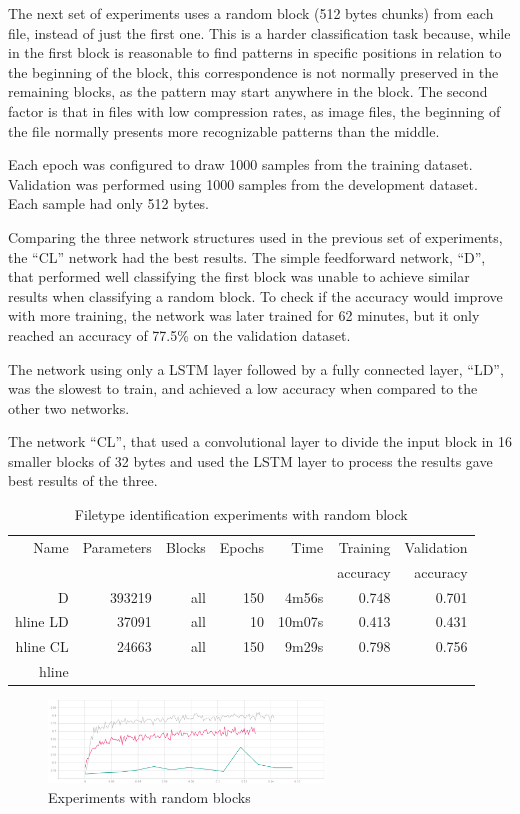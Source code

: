 The next set of experiments uses a random block (512 bytes chunks) from each file, instead of just the first one. This is a harder classification task because, while in the first block is reasonable to find patterns in specific positions in relation to the beginning of the block, this correspondence is not normally preserved in the remaining blocks, as the pattern may start anywhere in the block. The second factor is that in files with low compression rates, as image files, the beginning of the file normally presents more recognizable patterns than the middle.

Each epoch was configured to draw 1000 samples from the training dataset. Validation was performed using 1000 samples from the development dataset. Each sample had only 512 bytes.

Comparing the three network structures used in the previous set of experiments, the ``CL'' network had the best results.
The simple feedforward network, ``D'', that performed well classifying the first block was unable to achieve similar results when classifying a random block.
To check if the accuracy would improve with more training, the network was later trained for 62 minutes, but it only reached an accuracy of 77.5\% on the validation dataset.

The network using only a LSTM layer followed by a fully connected layer, ``LD'', was the slowest to train, and achieved a low accuracy when compared to the other two networks.

The network ``CL'', that used a convolutional layer to divide the input block in 16 smaller blocks of 32 bytes and used the LSTM layer to process the results gave best results of the three.

\begin{table}[!ht]
    \centering
    \caption{Filetype identification experiments with random block}
    \label{tab:carvingrandomblock}
\begin{tabular}{r|r|r|r|r|r|r}
\hline
Name & Parameters & Blocks & Epochs & Time    & Training          & Validation          \\       
     &            &        &        &         &          accuracy &            accuracy \\ \hline\hline

D	    & 393219	& all	& 150	& 4m56s	    & 0.748	& 0.701 \\hline
LD	    & 37091 	& all	& 10	& 10m07s	& 0.413	& 0.431 \\hline
CL	    & 24663	    & all	& 150	& 9m29s	    & 0.798	& 0.756 \\hline
\end{tabular}
\end{table}

\begin{figure}[htb!]
\centering\includegraphics[width=0.65\textwidth]{content/random-block.png}
\caption{\label{fig:randomblock}Experiments with random blocks}%
\end{figure}

